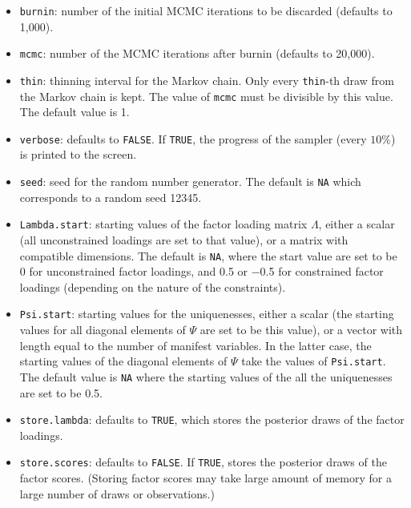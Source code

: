 \begin{itemize}
\item \texttt{burnin}: number of the initial MCMC iterations to be 
 discarded (defaults to 1,000). 

\item \texttt{mcmc}: number of the MCMC iterations after burnin
(defaults to 20,000).

\item \texttt{thin}: thinning interval for the Markov chain. Only every 
 \texttt{thin}-th draw from the Markov chain is kept. The value of 
\texttt{mcmc} must be divisible by this value. The default value is 1.

\item \texttt{verbose}: defaults to {\tt FALSE}.  If \texttt{TRUE}, the progress 
 of the sampler (every $10\%$) is printed to the screen.

\item \texttt{seed}: seed for the random number generator. The default
is \texttt{NA} which corresponds to a random seed 12345. 

\item \texttt{Lambda.start}: starting values of the factor loading
matrix $\Lambda$, either a scalar (all unconstrained loadings are set
to that value), or a matrix with compatible dimensions.  The default
is \texttt{NA}, where the start value are set to be 0 for
unconstrained factor loadings, and 0.5 or $-$0.5 for constrained
factor loadings (depending on the nature of the constraints).

\item \texttt{Psi.start}: starting values for the uniquenesses, either
a scalar (the starting values for all diagonal elements of $\Psi$ are
set to be this value), or a vector with length equal to the number of
manifest variables.  In the latter case, the starting values of the
diagonal elements of $\Psi$ take the values of \texttt{Psi.start}. The
default value is \texttt{NA} where the starting values of the all the
uniquenesses are set to be 0.5.

\item \texttt{store.lambda}: defaults to {\tt TRUE}, which stores the
posterior draws of the factor loadings.  

\item \texttt{store.scores}: defaults to {\tt FALSE}.  If {\tt TRUE},
stores the posterior draws of the factor scores.  (Storing factor
scores may take large amount of memory for a large number of draws
or observations.)

\end{itemize}

